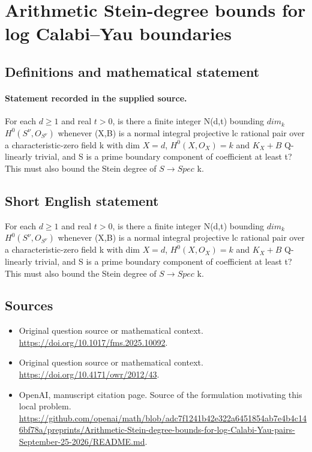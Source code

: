 \documentclass[11pt]{article}
\begin{document}
\section*{Arithmetic Stein-degree bounds for log Calabi–Yau boundaries}\label{statement}
\subsection{Definitions and mathematical statement}
\paragraph{Statement recorded in the supplied source.}
For each $d\geq 1$ and real $t>0$, is there a finite integer N(d,t) bounding $dim_k$ $H^{0}(S^\nu ,O_{S^\nu })$ whenever (X,B) is a normal integral projective lc rational pair over a characteristic-zero field k with dim $X=d$, $H^{0}(X,O_X)=k$ and $K_X+B$ Q-linearly trivial, and S is a prime boundary component of coefficient at least t? This must also bound the Stein degree of $S\to Spec$ k.
\subsection{Short English statement}
For each $d\geq 1$ and real $t>0$, is there a finite integer N(d,t) bounding $dim_k$ $H^{0}(S^\nu ,O_{S^\nu })$ whenever (X,B) is a normal integral projective lc rational pair over a characteristic-zero field k with dim $X=d$, $H^{0}(X,O_X)=k$ and $K_X+B$ Q-linearly trivial, and S is a prime boundary component of coefficient at least t? This must also bound the Stein degree of $S\to Spec$ k.
\subsection{Sources}
\begin{itemize}
\item[S1] Original question source or mathematical context.
\url{https://doi.org/10.1017/fms.2025.10092}.
\item[S2] Original question source or mathematical context.
\url{https://doi.org/10.4171/owr/2012/43}.
\item[S3] OpenAI, manuscript citation page. Source of the formulation motivating this local problem.
\url{https://github.com/openai/math/blob/adc7f1241b42e322a6451854ab7e4b4c146bf78a/preprints/Arithmetic-Stein-degree-bounds-for-log-Calabi-Yau-pairs-September-25-2026/README.md}.
\end{itemize}
\end{document}

